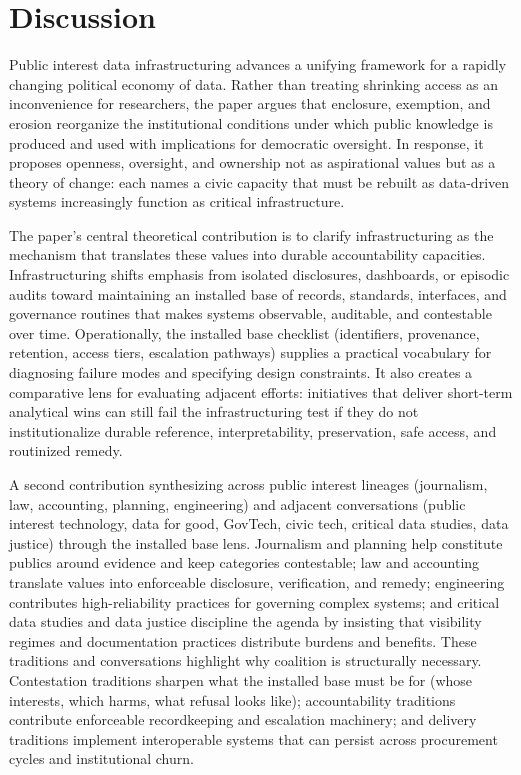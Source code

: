 \documentclass[acmsmall,screen]{acmart}
\begin{document}
\section*{Discussion}
Public interest data infrastructuring advances a unifying framework for a rapidly changing political economy of data. Rather than treating shrinking access as an inconvenience for researchers, the paper argues that enclosure, exemption, and erosion reorganize the institutional conditions under which public knowledge is produced and used with implications for democratic oversight. In response, it proposes openness, oversight, and ownership not as aspirational values but as a theory of change: each names a civic capacity that must be rebuilt as data-driven systems increasingly function as critical infrastructure.

The paper's central theoretical contribution is to clarify infrastructuring as the mechanism that translates these values into durable accountability capacities. Infrastructuring shifts emphasis from isolated disclosures, dashboards, or episodic audits toward maintaining an installed base of records, standards, interfaces, and governance routines that makes systems observable, auditable, and contestable over time. Operationally, the installed base checklist (identifiers, provenance, retention, access tiers, escalation pathways) supplies a practical vocabulary for diagnosing failure modes and specifying design constraints. It also creates a comparative lens for evaluating adjacent efforts: initiatives that deliver short-term analytical wins can still fail the infrastructuring test if they do not institutionalize durable reference, interpretability, preservation, safe access, and routinized remedy.

A second contribution synthesizing across public interest lineages (journalism, law, accounting, planning, engineering) and adjacent conversations (public interest technology, data for good, GovTech, civic tech, critical data studies, data justice) through the installed base lens. Journalism and planning help constitute publics around evidence and keep categories contestable; law and accounting translate values into enforceable disclosure, verification, and remedy; engineering contributes high-reliability practices for governing complex systems; and critical data studies and data justice discipline the agenda by insisting that visibility regimes and documentation practices distribute burdens and benefits. These traditions and conversations highlight why coalition is structurally necessary. Contestation traditions sharpen what the installed base must be for (whose interests, which harms, what refusal looks like); accountability traditions contribute enforceable recordkeeping and escalation machinery; and delivery traditions implement interoperable systems that can persist across procurement cycles and institutional churn. 
\end{document}
